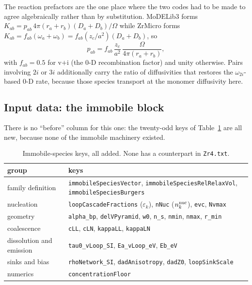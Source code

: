 \documentclass[11pt]{article}
\newcommand{\ZrM}{\textsf{ZrMicro}}
\newcommand{\MoD}{\textsf{MoDELib3}}
\newcommand{\code}[1]{\texttt{\small #1}}
\newcommand{\file}[1]{\texttt{\footnotesize #1}}
\begin{document}
The reaction prefactors are the one place where the two codes had to be made to
agree algebraically rather than by substitution. \MoD{} forms
$K_{ab} = p_{ab}\,4\pi(r_a+r_b)(D_a+D_b)/\Omega$ while \ZrM{} forms
$K_{ab} = f_{ab}(\omega_a+\omega_b) = f_{ab}(z_c/a^2)(D_a+D_b)$, so
\begin{equation}
p_{ab} = f_{ab}\,\frac{z_c}{a^2}\,\frac{\Omega}{4\pi(r_a+r_b)} ,
\label{eq:prefactor}
\end{equation}
with $f_{ab} = 0.5$ for v$+$i (the 0-D recombination factor) and unity
otherwise. Pairs involving $2i$ or $3i$ additionally carry the ratio of
diffusivities that restores the $\omega_{2i}$-based 0-D rate, because those
species transport at the monomer diffusivity here.

\subsection{Input data: the immobile block}

There is no ``before'' column for this one: the twenty-odd keys of
Table~\ref{tab:immdiff} are all new, because none of the immobile machinery
existed.

\begin{table}[htbp]
\centering
\caption{Immobile-species keys, all added. None has a counterpart in
\file{Zr4.txt}.}
\label{tab:immdiff}
\begin{tabular}{@{}lp{}@{}}
\toprule
group & keys \\
\midrule
family definition &
  \code{immobileSpeciesVector}, \code{immobileSpeciesRelRelaxVol},
  \code{immobileSpeciesBurgers} \\
nucleation &
  \code{loopCascadeFractions} ($\varepsilon_k$), \code{nNuc} ($n^{\rm nuc}_k$),
  \code{evc}, \code{Nvmax} \\
geometry &
  \code{alpha\_bp}, \code{delVPyramid}, \code{w0}, \code{n\_s},
  \code{nmin}, \code{nmax}, \code{r\_min} \\
coalescence &
  \code{cLL}, \code{cLN}, \code{kappaLL}, \code{kappaLN} \\
dissolution and emission &
  \code{tau0\_vLoop\_SI}, \code{Ea\_vLoop\_eV}, \code{Eb\_eV} \\
sinks and bias &
  \code{rhoNetwork\_SI}, \code{dadAnisotropy}, \code{dadZ0},
  \code{loopSinkScale} \\
numerics &
  \code{concentrationFloor} \\
\bottomrule
\end{tabular}
\end{table}
\end{document}
